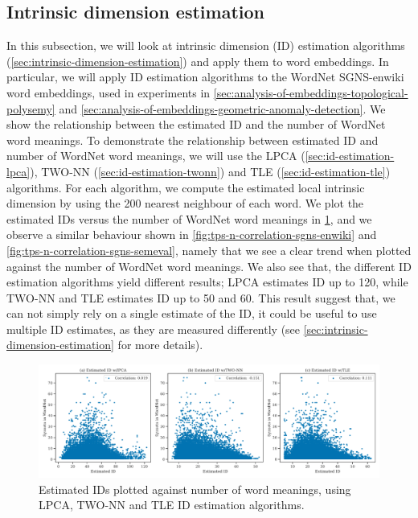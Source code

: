 \subsection{Intrinsic dimension estimation}
\label{sec:analysis-of-embeddings-intrinsic-dimension-estimation}
In this subsection, we will look at intrinsic dimension (ID) estimation algorithms (\cref{sec:intrinsic-dimension-estimation}) and apply them to word embeddings. In particular, we will apply ID estimation algorithms to the WordNet SGNS-enwiki word embeddings, used in experiments in \cref{sec:analysis-of-embeddings-topological-polysemy} and \cref{sec:analysis-of-embeddings-geometric-anomaly-detection}. We show the relationship between the estimated ID and the number of WordNet word meanings. To demonstrate the relationship between estimated ID and number of WordNet word meanings, we will use the LPCA (\cref{sec:id-estimation-lpca}), TWO-NN (\cref{sec:id-estimation-twonn}) and TLE (\cref{sec:id-estimation-tle}) algorithms. For each algorithm, we compute the estimated local intrinsic dimension by using the 200 nearest neighbour of each word. We plot the estimated IDs versus the number of WordNet word meanings in \cref{fig:intrinsic-dimension-estimation-vs-wordnet-synsets}, and we observe a similar behaviour shown in \cref{fig:tps-n-correlation-sgns-enwiki} and \cref{fig:tps-n-correlation-sgns-semeval}, namely that we see a clear trend when plotted against the number of WordNet word meanings. We also see that, the different ID estimation algorithms yield different results; LPCA estimates ID up to 120, while TWO-NN and TLE estimates ID up to 50 and 60. This result suggest that, we can not simply rely on a single estimate of the ID, it could be useful to use multiple ID estimates, as they are measured differently (see \cref{sec:intrinsic-dimension-estimation} for more details).
\begin{figure}[H]
    \centering
    \includegraphics[width=\textwidth]{thesis/figures/intrinsic-dimension-estimation-vs-wordnet-synsets.pdf}
    \caption{Estimated IDs plotted against number of word meanings, using LPCA, TWO-NN and TLE ID estimation algorithms.}
    \label{fig:intrinsic-dimension-estimation-vs-wordnet-synsets}
\end{figure}

